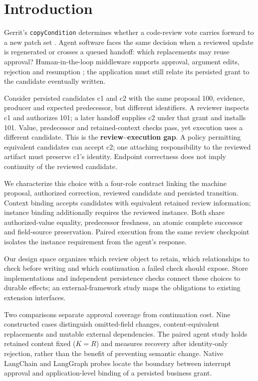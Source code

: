 

\section{Introduction}\label{introduction}

Gerrit's \texttt{copyCondition} determines whether a code-review vote carries forward to a new patch set \citep{gerrit-copy-condition}. Agent software faces the same decision when a reviewed update is regenerated or crosses a queued handoff: which replacements may reuse approval? Human-in-the-loop middleware supports approval, argument edits, rejection and resumption \citep{langchain-hitl}; the application must still relate its persisted grant to the candidate eventually written.

Consider persisted candidates c1 and c2 with the same proposal 100, evidence, producer and expected predecessor, but different identifiers. A reviewer inspects c1 and authorizes 101; a later handoff supplies c2 under that grant and installs 101. Value, predecessor and retained-context checks pass, yet execution uses a different candidate. This is the \textbf{review--execution gap}. A policy permitting equivalent candidates can accept c2; one attaching responsibility to the reviewed artifact must preserve c1's identity. Endpoint correctness does not imply continuity of the reviewed candidate.

We characterize this choice with a four-role contract linking the machine proposal, authorized correction, reviewed candidate and persisted transition. Context binding accepts candidates with equivalent retained review information; instance binding additionally requires the reviewed instance. Both share authorized-value equality, predecessor freshness, an atomic complete successor and field-source preservation. Paired execution from the same review checkpoint isolates the instance requirement from the agent's response.

Our design space organizes which review object to retain, which relationships to check before writing and which continuation a failed check should expose. Store implementations and independent persistence checks connect these choices to durable effects; an external-framework study maps the obligations to existing extension interfaces.

Two comparisons separate approval coverage from continuation cost. Nine constructed cases distinguish omitted-field changes, content-equivalent replacements and mutable external dependencies. The paired agent study holds retained content fixed ($K=R$) and measures recovery after identity-only rejection, rather than the benefit of preventing semantic change. Native LangChain and LangGraph probes locate the boundary between interrupt approval and application-level binding of a persisted business grant.


